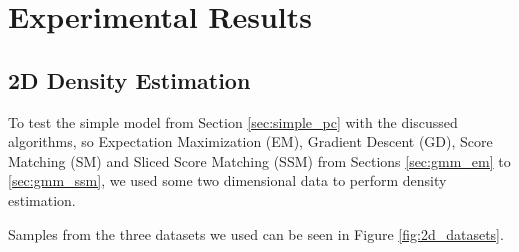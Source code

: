 \renewcommand{\vec}[1]{\textbf{#1}}

\chapter{Experimental Results}
\label{cha:experimental_results}

\section{2D Density Estimation}

To test the simple model from Section \ref{sec:simple_pc} with the discussed algorithms, so Expectation Maximization (EM), 
Gradient Descent (GD), Score Matching (SM) and Sliced Score Matching (SSM) from Sections \ref{sec:gmm_em} to \ref{sec:gmm_ssm}, we used some 
two dimensional data to perform density estimation. 

Samples from the three datasets we used can be seen in Figure \ref{fig:2d_datasets}. \\

